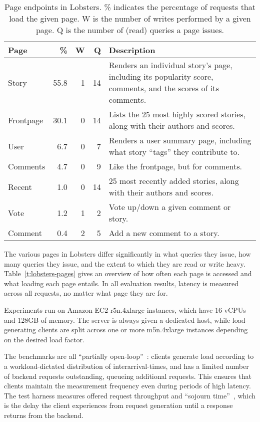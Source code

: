 \begin{table}
  \begin{tabular}{ p{0.8in} | r | r | r | p{2.9in} }
    Page & \% & W & Q & Description \\
    \hline
    Story & 55.8 & 1 & 14 & Renders an individual story's page, including its
    popularity score, comments, and the scores of its comments.\\
    Frontpage & 30.1 & 0 & 14 & Lists the 25 most highly scored stories, along
    with their authors and scores.\\
    User & 6.7 & 0 & 7 & Renders a user summary page, including what story
    ``tags'' they contribute to.\\
    Comments & 4.7 & 0 & 9 & Like the frontpage, but for comments.\\
    Recent & 1.0 & 0 & 14 & 25 most recently added stories, along with their
    authors and scores.\\
    Vote & 1.2 & 1 & 2 & Vote up/down a given comment or story.\\
    Comment & 0.4 & 2 & 5 & Add a new comment to a story.\\
  \end{tabular}
  \caption{Page endpoints in Lobsters. \% indicates the percentage of requests
  that load the given page. W is the number of writes performed by a given page.
  Q is the number of (read) queries a page issues.}
  \label{t:lobsters-pages}
\end{table}

The various pages in Lobsters differ significantly in what queries they issue,
how many queries they issue, and the extent to which they are read or write
heavy. Table~\vref{t:lobsters-pages} gives an overview of how often each page is
accessed and what loading each page entails. In all evaluation results, latency
is measured across all requests, no matter what page they are for.

Experiments run on Amazon EC2 r5n.4xlarge instances, which have 16 vCPUs and
128GB of memory. The server is always given a dedicated host, while
load-generating clients are split across one or more m5n.4xlarge instances
depending on the desired load factor.

The benchmarks are all ``partially open-loop''~\cite{frank-open-loop}:
clients generate load according to a workload-dictated distribution of
interarrival-times, and has a limited number of backend requests outstanding,
queueing additional requests. This ensures that clients maintain the measurement
frequency even during periods of high latency. The test harness measures offered
request throughput and ``sojourn time''~\cite{open-loop-cautionary-tale}, which
is the delay the client experiences from request generation until a response
returns from the backend.

